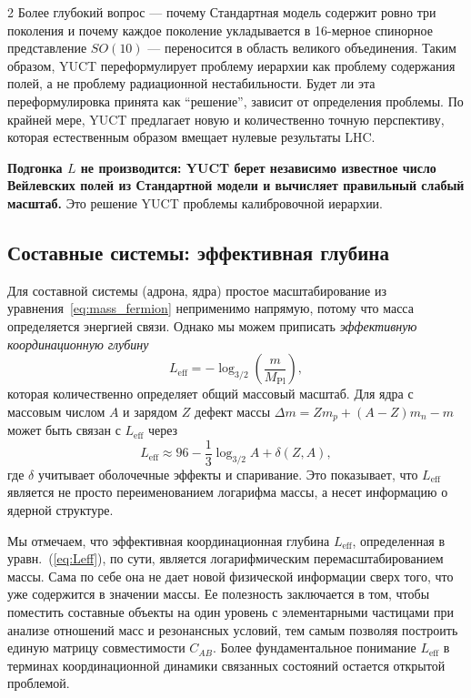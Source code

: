\documentclass[11pt,a4paper]{article}
\begin{document}
\begin{multicols}{2}
		Более глубокий вопрос — почему Стандартная модель содержит ровно три поколения и почему каждое поколение укладывается в 16-мерное спинорное представление \(SO(10)\) — переносится в область великого объединения. Таким образом, YUCT переформулирует проблему иерархии как проблему содержания полей, а не проблему радиационной нестабильности. Будет ли эта переформулировка принята как ``решение'', зависит от определения проблемы. По крайней мере, YUCT предлагает новую и количественно точную перспективу, которая естественным образом вмещает нулевые результаты LHC.
		
		\textbf{Подгонка $L$ не производится: YUCT берет независимо известное число Вейлевских полей из Стандартной модели и вычисляет правильный слабый масштаб.} Это решение YUCT проблемы калибровочной иерархии.
		
		\subsection{Составные системы: эффективная глубина}
		
		Для составной системы (адрона, ядра) простое масштабирование из уравнения~\eqref{eq:mass_fermion} неприменимо напрямую, потому что масса определяется энергией связи. Однако мы можем приписать \emph{эффективную координационную глубину}
		\begin{equation}
			L_{\mathrm{eff}} = -\log_{3/2}\left( \frac{m}{M_{\mathrm{Pl}}} \right),
			\label{eq:Leff}
		\end{equation}
		которая количественно определяет общий массовый масштаб. Для ядра с массовым числом \(A\) и зарядом \(Z\) дефект массы \(\Delta m = Z m_p + (A-Z) m_n - m\) может быть связан с \(L_{\mathrm{eff}}\) через
		\begin{equation}
			L_{\mathrm{eff}} \approx 96 - \frac{1}{3} \log_{3/2} A + \delta(Z,A),
		\end{equation}
		где \(\delta\) учитывает оболочечные эффекты и спаривание. Это показывает, что \(L_{\mathrm{eff}}\) является не просто переименованием логарифма массы, а несет информацию о ядерной структуре.
		
		Мы отмечаем, что эффективная координационная глубина \(L_{\mathrm{eff}}\), определенная в уравн.~(\ref{eq:Leff}), по сути, является логарифмическим перемасштабированием массы. Сама по себе она не дает новой физической информации сверх того, что уже содержится в значении массы. Ее полезность заключается в том, чтобы поместить составные объекты на один уровень с элементарными частицами при анализе отношений масс и резонансных условий, тем самым позволяя построить единую матрицу совместимости \(C_{AB}\). Более фундаментальное понимание \(L_{\mathrm{eff}}\) в терминах координационной динамики связанных состояний остается открытой проблемой.
		
	\end{multicols}
	
\end{document}
